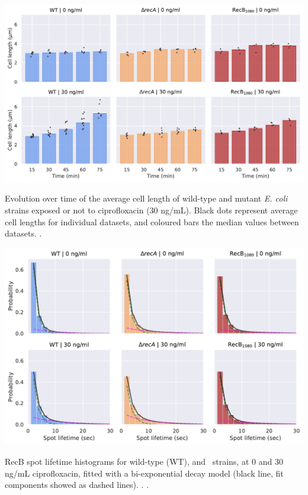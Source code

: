 \begin{suppfigure*}[htbp]
    \begin{center}
    \includegraphics[width=.8\textwidth]{SI_Figures/Mutants_cell_lengths.pdf}
    \end{center}
    \caption{Evolution over time of the average cell length of wild-type and mutant \emph{E. coli} strains exposed or not to ciprofloxacin (30 ng/mL). Black dots represent average cell lengths for individual datasets, and coloured bars the median values between datasets. .}
    \label{SIFig:mutants_cell_lengths}
\end{suppfigure*}

\begin{suppfigure*}[htbp]
    \begin{center}
    \includegraphics[width=.8\textwidth]{SI_Figures/Mutants_RecB_fits.pdf}
    \end{center}
    \caption{RecB spot lifetime histograms for wild-type (WT), \dreca and \teneighty\ strains, at 0 and 30 ng/mL ciprofloxacin, fitted with a bi-exponential decay model (black line, fit components showed as dashed lines). . .}
    \label{SIFig:mutants_biexp_fits}
\end{suppfigure*}

